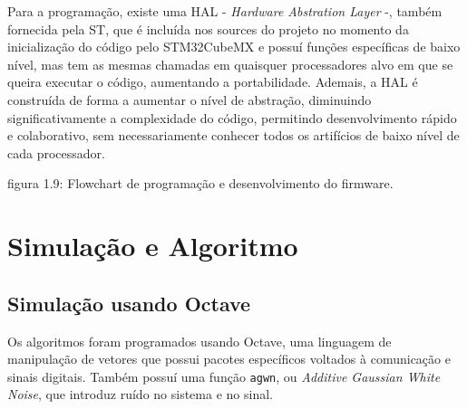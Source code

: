 \documentclass[11pt,a4paper]{report}
\begin{document}
	Para a programação, existe uma HAL - {\it Hardware Abstration Layer} -, também fornecida pela ST, que é incluída nos sources do projeto no momento da inicialização do código pelo STM32CubeMX e possuí funções específicas de baixo nível, mas tem as mesmas chamadas em quaisquer processadores alvo em que se queira executar o código, aumentando a portabilidade. Ademais, a HAL é construída de forma a aumentar o nível de abstração, diminuindo significativamente a complexidade do código, permitindo desenvolvimento rápido e colaborativo, sem necessariamente conhecer todos os artifícios de baixo nível de cada processador.
	\begin{center}
		\vspace{0.1cm}
	\footnotesize{figura 1.9: Flowchart de programação e desenvolvimento do firmware.}
	\end{center}

\chapter{Simulação e Algoritmo}
	\section{Simulação usando Octave}
	
	Os algoritmos foram programados usando Octave, uma linguagem de manipulação de vetores que possui pacotes específicos voltados à comunicação e sinais digitais. Também possuí uma função \texttt{agwn}, ou {\it Additive Gaussian White Noise}, que introduz ruído no sistema e no sinal.\\
	
\end{document}
